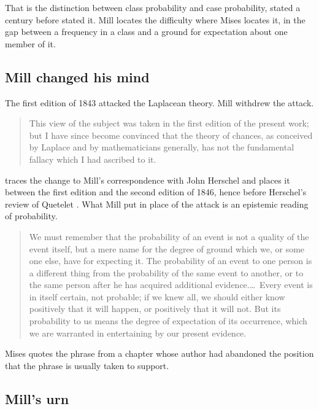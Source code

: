 \documentclass[12pt]{article}
\begin{document}
That is the distinction between class probability and case probability, stated
a century before \citet{Mises1998HumanAction} stated it.  Mill locates the
difficulty where Mises locates it, in the gap between a frequency in a class
and a ground for expectation about one member of it.

\subsection{Mill changed his mind}

The first edition of 1843 attacked the Laplacean theory.  Mill withdrew the
attack.

\begin{quote}
This view of the subject was taken in the first edition of the present work; but
I have since become convinced that the theory of chances, as conceived by
Laplace and by mathematicians generally, has not the fundamental fallacy which I
had ascribed to it.
\hfill \citep[Bk.~III, ch.~XVIII, \S1]{Mill1882Logic}
\end{quote}

\citet{Skyrms2018} traces the change to Mill's correspondence with John
Herschel and places it between the first edition and the second edition of
1846, hence before Herschel's review of Quetelet \citep{Herschel1850}.  What
Mill put in place of the attack is an epistemic reading of probability.

\begin{quote}
We must remember that the probability of an event is not a quality of the event
itself, but a mere name for the degree of ground which we, or some one else,
have for expecting it.  The probability of an event to one person is a different
thing from the probability of the same event to another, or to the same person
after he has acquired additional evidence.\ldots\ Every event is in itself
certain, not probable; if we knew all, we should either know positively that it
will happen, or positively that it will not.  But its probability to us means
the degree of expectation of its occurrence, which we are warranted in
entertaining by our present evidence.
\hfill \citep[Bk.~III, ch.~XVIII, \S1]{Mill1882Logic}
\end{quote}

Mises quotes the phrase from a chapter whose author had abandoned the position
that the phrase is usually taken to support.

\subsection{Mill's urn}
\end{document}
